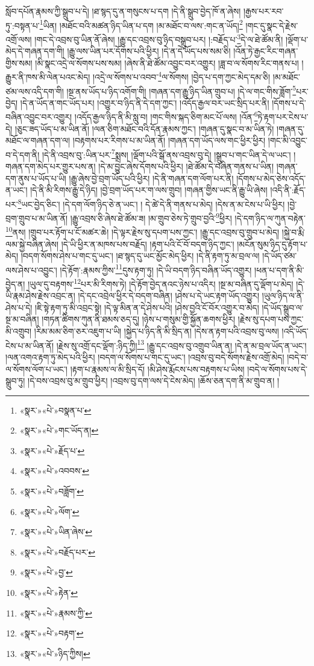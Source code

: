 སློབ་དཔོན་རྣམས་ཀྱི་སྒྲུབ་པ་དེ། །ཐ་སྙད་དུ་ན་གསུངས་པ་དག །དེ་ནི་སྒྲུབ་བྱེད་ཁོ་ན་ཞེས། །རྒྱས་པར་རབ་ཏུ་:བསྟན་པ་\footnote{«སྣར་»«པེ་»བསྣན་པ་}ཡིན། །མཐོང་བའི་མཚན་ཉིད་ཡིན་པ་དག །མ་མཐོང་བ་ལས་:གང་ན་ཡོད།\footnote{«སྣར་»«པེ་»གང་ཡོད་ན།} །གང་དུ་སྣང་དེ་རྗེས་འགྲོ་ལས། །གང་དེ་འབྲས་བུ་ཡིན་ནོ་ཞེས། །རྒྱུ་དང་འབྲས་བུ་ཉིད་བསྒྲུབ་པར། །:བརྗོད་པ་\footnote{«སྣར་»«པེ་»རྗོད་པ་}དེ་ལ་ཐེ་ཚོམ་ནི། །ལྡོག་པ་མེད་དེ་གཞན་དག་གི། །རྒྱུ་ལས་ཡིན་པར་དོགས་པའི་ཕྱིར། །དེ་ན་དེ་ཡོད་པས་སམ་ཅི། །འོན་ཏེ་རྒྱང་རིང་གཞན་གྱིས་སམ། །མི་སྣང་འདྲེ་ལ་སོགས་པས་སམ། །ཞེས་ནི་ཐེ་ཚོམ་འབྱུང་བར་འགྱུར། །ཟླ་བ་ལ་སོགས་རིང་གནས་པ། །རྒྱུར་ནི་ཁས་མི་ལེན་པའང་མེད། །འདྲེ་ལ་སོགས་པ་འབབ་\footnote{«སྣར་»«པེ་»འབབས་}ལ་སོགས། །བྱེད་པ་དག་ཀྱང་མེད་དམ་ཅི། །མ་མཐོང་ཙམ་ལས་འདི་དག་གི། །སྔ་ནས་ཡོད་པ་ཉིད་འགོག་གི། །གཞན་དག་རྒྱུ་ཉིད་ཡིན་གྲུབ་པ། །དེ་ལ་གང་གིས་ཟློག་\footnote{«སྣར་»«པེ་»བཟློག་}པར་བྱེད། །དེ་ན་ཡོད་ན་གང་ཡོད་པར། །འགྱུར་བ་ཉིད་ནི་དེ་དག་ཀྱང་། །འདོད་རྒྱལ་བར་ཡང་སྲིད་པར་ནི། །དོགས་པ་དེ་བཞིན་འབྱུང་བར་འགྱུར། །འདོད་རྒྱལ་ཉིད་ནི་མི་སླུ་བ། །གང་གིས་སྐད་ཅིག་མང་པོ་ལས། །འོན་\footnote{«སྣར་»«པེ་»ལོག་}ཏེ་རྟག་པར་ངེས་པ་དེ། །ཅུང་ཟད་ཡོད་པ་མ་ཡིན་ནོ། །ལན་ཅིག་མཐོང་བའི་དོན་རྣམས་ཀྱང་། །གཞན་དུ་སྣང་བ་མ་ཡིན་ཏེ། །གཞན་དུ་མཐོང་ལ་གཞན་དག་ལ། །བརྟགས་པར་རིགས་པ་མ་ཡིན་ནོ། །གཞན་དག་ཡོད་ལས་གང་ཕྱིར་ཕྱིར། །གང་མི་འབྱུང་བ་དེ་དག་ནི། །དེ་ནི་འབྲས་བུ་:ཡིན་པར་\footnote{«སྣར་»«པེ་»ཡིན་ཞེས་}སྨྲས། །ལྡོག་པའི་སྒོ་ནས་འབྲས་བུ་དེ། །སྒྲུབ་པ་གང་ཡིན་དེ་ལ་ཡང་། །གཞན་དག་མེད་པར་གྱུར་པས་ན། །དེ་མ་བྱུང་ཞེས་དོགས་པའི་ཕྱིར། །ཐེ་ཚོམ་དེ་བཞིན་གནས་པ་ཡིན། །གཞན་དག་ནུས་པ་ཡོད་པ་ཡི། །རྒྱུ་ཞེས་བྱེ་བྲག་ཡོད་པའི་ཕྱིར། །དེ་ནི་གཞན་དག་ལོག་པར་ནི། །དོགས་པ་མེད་ཅེས་འདོད་ན་ཡང་། །དེ་ནི་མི་རིགས་རྒྱུ་དེ་ཉིད། །བྱེ་བྲག་ཡོད་པར་ག་ལས་གྲུབ། །གཞན་གྱིས་ཡང་ནི་རྒྱུ་ཡི་ཞེས། །འདི་ནི་:རྗོད་པར་\footnote{«སྣར་»«པེ་»བརྗོད་པར་}ཡང་བྱེད་ཅིང་། །དེ་དག་ལོག་ཉིད་ཅེ་ན་ཡང་། །
དེ་ཚེ་དེ་ནི་གནས་པ་མེད། །དེས་ན་མ་ངེས་པ་ཡི་ཕྱིར། །བྱེ་བྲག་གྲུབ་པ་མ་ཡིན་ནོ། །རྒྱུ་འབྲས་ཅི་ཞེས་ཐེ་ཚོམ་ཟ། །མ་གྲུབ་ཅེས་ཏེ་གྲུབ་བྱའི་\footnote{«སྣར་»«པེ་»བྱ་}ཕྱིར། །དེ་དག་ཉིད་ལ་ཀུན་བརྟེན་\footnote{«སྣར་»«པེ་»རྟེན་}ནས། །གྲུབ་པར་རྟོག་པ་ངོ་མཚར་ཆེ། །དེ་ལྟར་རྗེས་སུ་དཔག་པས་ཀྱང་། །རྒྱུ་དང་འབྲས་བུ་གྲུབ་པ་མེད། །སྐྱེ་བ་རྨི་ལམ་སྐྱེ་བཞིན་ཞེས། །དེ་ཡི་ཕྱིར་ན་མཁས་པས་བརྗོད། །རྟག་པའི་ངོ་བོ་བདག་ཉིད་ཀྱང་། །མངོན་སུམ་ཉིད་དུ་རྟོག་པ་མེད། །བདག་སོགས་ཤེས་པ་གང་དུ་ཡང་། །ཐ་སྙད་དུ་ཡང་མྱོང་མེད་ཕྱིར། །དེ་ནི་རྟག་ཏུ་མ་བྲལ་ལ། །དེ་ཡོད་ཙམ་ལས་ཤེས་པ་འབྱུང་། །དེ་རྟོག་:རྣམས་ཀྱིས་\footnote{«སྣར་»«པེ་»རྣམས་ཀྱི་}དུས་རྟག་ཏུ། །དེ་ཡི་བདག་ཉིད་བཞིན་ཡོད་འགྱུར། །ཕན་པ་དག་ནི་མི་བྱེད་ན། །ཡུལ་དུ་བརྟགས་\footnote{«སྣར་»«པེ་»བརྟག་}པར་མི་རིགས་ཏེ། །དེ་རྟོག་བྱེད་ནའང་ཉེས་པ་འདིར། །སྔ་མ་བཞིན་དུ་ལྡོག་པ་མེད། །དེ་ཡི་རྣམ་ཤེས་རྗེས་འབྲང་ན། །དེ་དང་འབྲེལ་ཕྱིར་དེ་བདག་བཞིན། །ཤེས་པ་དེ་ཡང་རྟག་ཡོད་འགྱུར། །ཡུལ་ཉིད་ལ་ནི་ཤེས་པ་དེ། །ཇི་སྟེ་རྟག་ཏུ་མི་འབྲང་སྟེ། །དེ་ལྟ་མིན་ན་དེ་ཤེས་པའི། །ཤེས་བྱའི་ངོ་བོར་འགྱུར་བ་མེད། །དེ་ཡོད་སྒྲུབ་ལ་སྔ་མ་བཞིན། །གཏན་ཚིགས་ཀུན་ནི་ཐམས་ཅད་དུ། །ཉེས་པ་གསུམ་གྱི་སྐྱོན་ཆགས་ཕྱིར། །རྗེས་སུ་དཔག་པས་ཀྱང་མི་འགྲུབ། །རིམ་མམ་ཅིག་ཅར་འཇུག་པ་ཡི། །སྐྱེད་པ་ཉིད་ནི་མི་སྲིད་ན། །དེས་ན་རྟག་པའི་འབྲས་བུ་ལས། །འདི་ཡོད་ངེས་པ་མ་ཡིན་ནོ། །རྗེས་སུ་འགྲོ་དང་ལྡོག་:ཉིད་ཀྱི།\footnote{«སྣར་»«པེ་»ཉིད་ཀྱིས།} །རྒྱུ་དང་འབྲས་བུ་འགྲུབ་ཡིན་ན། །དེ་ན་མ་བྲལ་ཡོད་ན་ཡང་། །ལན་འགའ་རྟག་ཏུ་མེད་པའི་ཕྱིར། །བདག་ལ་སོགས་པ་གང་དུ་ཡང་། །འབྲས་བུ་བདེ་སོགས་རྗེས་འགྲོ་མེད། །བདེ་བ་ལ་སོགས་ལོག་པ་ཡང་། །རྟག་པ་རྣམས་ལ་མི་སྲིད་དོ། །མི་ཤེས་རྨོངས་པས་བརྟགས་པ་ཡིས། །བདེ་ལ་སོགས་པས་དེ་སྒྲུབ་ཏུ། །དེ་བས་འབྲས་བུ་མ་གྲུབ་ཕྱིར། །འབྲས་བུ་དག་ལས་དེ་ངེས་མེད། །ཆོས་ཅན་དག་ནི་མ་གྲུབ་ན། །
